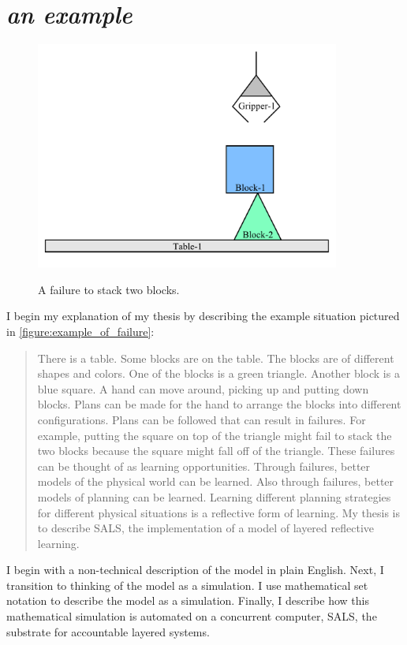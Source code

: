 \chapter{\emph{an example}}
\label{chapter:an_example}

\begin{figure}[bth]
\includegraphics[width=10cm]{gfx/blocks_world_example_failure} \\ \medskip
\caption{A failure to stack two blocks.}
\label{figure:example_of_failure}
\end{figure}

I begin my explanation of my thesis by describing the example
situation pictured in \autoref{figure:example_of_failure}:
\begin{quote}
There is a table.  Some blocks are on the table.  The blocks are of
different shapes and colors.  One of the blocks is a green triangle.
Another block is a blue square.  A hand can move around, picking up
and putting down blocks.  Plans can be made for the hand to arrange
the blocks into different configurations.  Plans can be followed that
can result in failures.  For example, putting the square on top of the
triangle might fail to stack the two blocks because the square might
fall off of the triangle.  These failures can be thought of as
learning opportunities.  Through failures, better models of the
physical world can be learned.  Also through failures, better models
of planning can be learned.  Learning different planning strategies
for different physical situations is a reflective form of learning.
My thesis is to describe SALS, the implementation of a model of
layered reflective learning.
\end{quote}
I begin with a non-technical description of the model in plain
English.  Next, I transition to thinking of the model as a simulation.
I use mathematical set notation to describe the model as a simulation.
Finally, I describe how this mathematical simulation is automated on a
concurrent computer, SALS, the substrate for accountable layered
systems.


